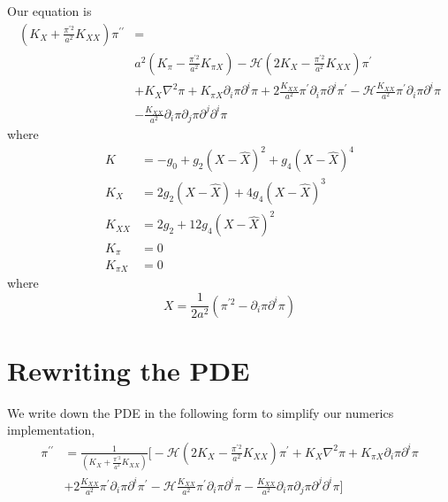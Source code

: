 \documentclass[a4paper,11pt]{article}
\begin{document}

Our equation is
\begin{equation}
\begin{aligned}
\left(K_{X}+\frac{\pi^{\prime 2}}{a^{2}} K_{X X}\right) \pi^{\prime \prime} &=\\
& a^{2}\left(K_{\pi}-\frac{\pi^{\prime 2}}{a^{2}} K_{\pi X}\right)-\mathcal{H}\left(2 K_{X}-\frac{\pi^{\prime 2}}{a^{2}} K_{X X}\right) \pi^{\prime} \\
&+K_{X} \nabla^{2} \pi+K_{\pi X} \partial_{i} \pi \partial^{i} \pi+2 \frac{K_{X X}}{a^{2}} \pi^{\prime} \partial_{i} \pi \partial^{i} \pi^{\prime}-\mathcal{H} \frac{K_{X X}}{a^{2}} \pi^{\prime} \partial_{i} \pi \partial^{i} \pi \\
&-\frac{K_{X X}}{a^{2}} \partial_{i} \pi \partial_{j} \pi \partial^{j} \partial^{i} \pi
\end{aligned}
\end{equation}
where
$$
\begin{aligned}
K &=-g_{0}+g_{2}(X-\hat{X})^{2}+g_{4}(X-\hat{X})^{4} \\
K_{X} &=2 g_{2}(X-\hat{X})+4 g_{4}(X-\hat{X})^{3} \\
K_{X X} &=2 g_{2}+12 g_{4}(X-\hat{X})^{2} \\
K_{\pi} &=0 \\
K_{\pi X} &=0
\end{aligned}
$$
where
$$
X=\frac{1}{2 a^{2}}\left(\pi^{\prime 2}-\partial_{i} \pi \partial^{i} \pi\right)
$$
\section{Rewriting the PDE}
We write down the PDE in the following form to simplify our numerics implementation,
\begin{equation}
\begin{aligned}
 \pi^{\prime \prime} &= \frac{1}{\left(K_{X}+\frac{\pi^{\prime 2}}{a^{2}} K_{X X}\right)}  \Bigg[ -\mathcal{H}\left(2 K_{X}-\frac{\pi^{\prime 2}}{a^{2}} K_{X X}\right) \pi^{\prime} +K_{X} \nabla^{2} \pi+K_{\pi X} \partial_{i} \pi \partial^{i} \pi\\
&+2 \frac{K_{X X}}{a^{2}} \pi^{\prime} \partial_{i} \pi \partial^{i} \pi^{\prime}-\mathcal{H} \frac{K_{X X}}{a^{2}} \pi^{\prime} \partial_{i} \pi \partial^{i} \pi -\frac{K_{X X}}{a^{2}} \partial_{i} \pi \partial_{j} \pi \partial^{j} \partial^{i} \pi  \Bigg]
\end{aligned}
\end{equation}
\end{document}
